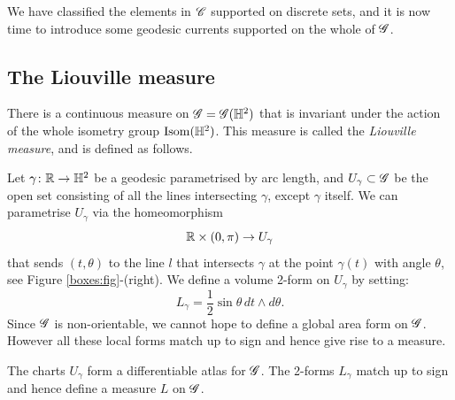 We have classified the elements in $\mathscr{C}$ supported on discrete sets, and it is now time to  introduce some geodesic currents supported on the whole of $\mathscr{G}$.

\subsection{The Liouville measure}
There is a continuous measure on $\mathscr{G} = \mathscr{G}(\mathbb{H}^2)$ that is invariant under the action of the whole isometry group ${\rm Isom}(\mathbb{H}^2)$. This measure is called the \emph{Liouville measure}, and is defined as follows.

Let $\gamma\colon \mathbb{R} \to \mathbb{H}^2$ be a geodesic parametrised by arc length, and $U_\gamma\subset \mathscr{G}$ be the open set consisting of all the lines intersecting $\gamma$, except $\gamma$ itself. We can parametrise $U_\gamma$ via the homeomorphism 
$$\mathbb{R} \times (0,\pi) \to U_\gamma$$ 
that sends $(t, \theta)$ to the line $l$ that intersects $\gamma$ at the point $\gamma(t)$ with angle $\theta$, see Figure \ref{boxes:fig}-(right). We define a volume 2-form on $U_\gamma$ by setting: 
$$L_\gamma = \frac 12 \sin\theta\, dt\wedge d\theta.$$
Since $\mathscr{G}$ is non-orientable, we cannot hope to define a global area form on $\mathscr{G}$. However all these local forms match up to sign and hence give rise to a measure.
\begin{prop}
The charts $U_\gamma$ form a differentiable atlas for $\mathscr{G}$. The 2-forms $L_\gamma$ match up to sign and hence define a measure  $L$ on $\mathscr{G}$.
\end{prop}
